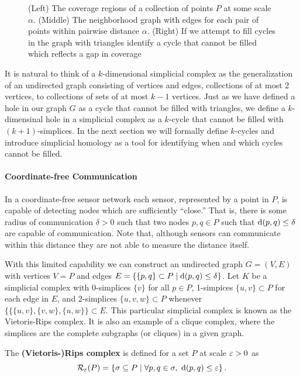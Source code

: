 {\begin{figure}[htbp]
     \caption{(Left) The coverage regions of a collection of points $P$ at some scale $\alpha$.
            (Middle) The neighborhood graph with edges for each pair of points within pairwise distance $\alpha$.
            (Right) If we attempt to fill cycles in the graph with triangles identify a cycle that cannot be filled which reflects a gap in coverage}
     \label{fig:holes}
\end{figure}}

It is natural to think of a $k$-dimensional simplicial complex as the generalization of an undirected graph consisting of vertices and edges, collections of at most 2 vertices, to collections of sets of at most $k-1$ vertices.
Just as we have defined a hole in our graph $G$ as a cycle that cannot be filled with triangles, we define a $k$-dimensinal hole in a simplicial complex as a $k$-cycle that cannot be filled with $(k+1)$-simplices.
In the next section we will formally define $k$-cycles and introduce simplicial homology as a tool for identifying when and which cycles cannot be filled.

\paragraph{Coordinate-free Communication}
In a coordinate-free sensor network each sensor, represented by a point in $P$, is capable of detecting nodes which are sufficiently ``close.''
That is, there is some radius of communication $\delta > 0$ such that two nodes $p, q\in P$ such that $\mathrm{d}(p, q) \leq\delta$ are capable of communication.
Note that, although sensors can communicate within this distance they are not able to measure the distance itself.

With this limited capability we can construct an undirected graph $G=(V, E)$ with vertices $V=P$ and edges $E = \{\{p, q\}\subset P\mid \mathrm{d}(p,q)\leq\delta\}$.
Let $K$ be a simplicial complex with 0-simplices $\{v\}$ for all $p\in P$, 1-simpices $\{u, v\}\subset P$ for each edge in $E$, and 2-simplices $\{u,v,w\}\subset P$ whenever $\{\{\{u,v\},\{v,w\},\{u,w\}\}\subset E$.
This particular simplicial complex is known as the Vietoris-Rips complex.
It is also an example of a clique complex, where the simplices are the complete subgraphs (or cliques) in a given graph.
\begin{definition}
    The \textbf{(Vietoris-)Rips complex} is defined for a set $P$ at scale $\varepsilon > 0$ as
    \[ \mathcal{R}_\varepsilon(P) = \left\{\sigma \subseteq P\mid \forall p,q\in\sigma,\ \mathrm{d}(p, q)\leq \varepsilon\right\}. \]
\end{definition}

